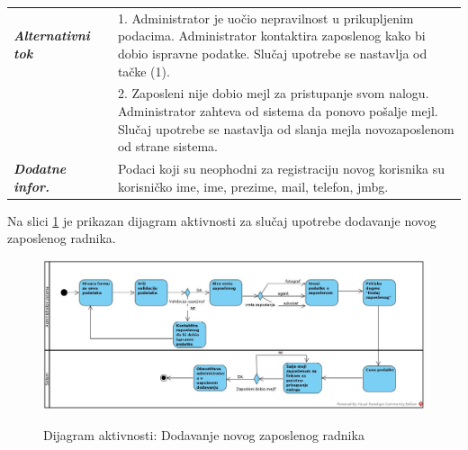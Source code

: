 \documentclass[20pt]{article}
\begin{document}
\begin{center}
\begin{longtable}{p{0.23\linewidth} p{0.77\linewidth}}
 {\it \bfseries Alternativni tok} & 1. Administrator je uo\v {c}io nepravilnost u prikupljenim podacima. Administrator kontaktira zaposlenog kako bi dobio ispravne podatke. Slu\v {c}aj upotrebe se nastavlja od ta\v {c}ke (1).\\
 & 2. Zaposleni nije dobio mejl za pristupanje svom nalogu. Administrator zahteva od sistema da ponovo po\v {s}alje mejl. Slu\v {c}aj upotrebe se nastavlja od slanja mejla novozaposlenom od strane sistema.\\
 \hline
 {\it \bfseries Dodatne infor.} & Podaci koji su neophodni za registraciju novog korisnika su korisni\v {c}ko ime, ime, prezime, mail, telefon, jmbg.\\
 \hline
\end{longtable}
\end{center}
Na slici \ref{fig:dijagramAktivnostiDodavanjaZaposlenog} je prikazan dijagram aktivnosti za slu\v{c}aj upotrebe dodavanje novog zaposlenog radnika.
\begin{figure}[h]
		\centering
		\includegraphics[width=1.1\textwidth,height=0.51\textheight]{Pictures/DodavanjeNovogZaposlenogRadnika.jpg}\\
		\caption{Dijagram aktivnosti: Dodavanje novog zaposlenog radnika}
		\label{fig:dijagramAktivnostiDodavanjaZaposlenog}
	\end{figure}


\newpage
{}
\setlength{\parindent}{1cm}
\fontsize{13}{18} \selectfont 
\end{document}
